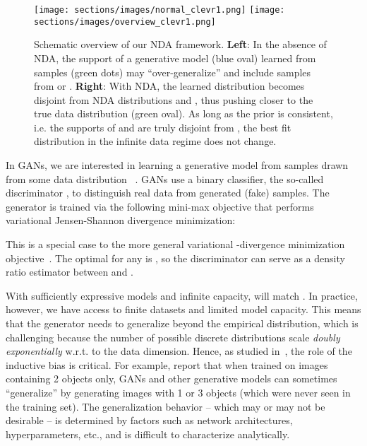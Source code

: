 \documentclass{article} \usepackage{iclr2021_conference,times}
\begin{document}
\begin{figure*}[!h]
\centering
    \texttt{[image: sections/images/normal\_clevr1.png]}\hspace{2em}
    \texttt{[image: sections/images/overview\_clevr1.png]}
    \caption{Schematic overview of our NDA framework. \textbf{Left}: In the absence of NDA, the support of a generative model  (blue oval) learned from samples (green dots) may ``over-generalize'' and include samples from  or . \textbf{Right}: With NDA, the learned distribution  becomes disjoint from NDA distributions  and , thus pushing   closer to the true data distribution  (green oval).
    As long as the prior is consistent, i.e. the supports of  and  are truly disjoint from , the best fit distribution in the infinite data regime does not change. 
}
    \label{fig:overview}
\end{figure*}

In GANs, we are interested in learning a generative model  from samples drawn from some data distribution ~\citep{goodfellow2014generative}.
GANs use a binary classifier, the so-called discriminator , to distinguish real data from generated (fake) samples. The generator  is trained 
via the following mini-max objective that performs variational Jensen-Shannon divergence minimization:

This is a special case to the more general variational -divergence minimization objective~\citep{nowozin2016f}. The optimal  for any  is , so the discriminator can serve as a density ratio estimator between  and . 



With sufficiently expressive models and infinite capacity,   will match . 
In practice, however, we have access to finite datasets and limited model capacity. 
This means that the generator needs to generalize beyond the empirical distribution, which is challenging because the number of possible discrete distributions scale \emph{doubly exponentially} w.r.t. to the data dimension.
Hence, as studied in~\citep{zhao2018bias}, the role of the inductive bias is critical.
For example, \cite{zhao2018bias} report that when trained on images containing 2 objects only, GANs and other generative models can sometimes 
``generalize''
by generating images with 1 or 3 objects (which were never seen in the training set).
The generalization behavior -- which may or may not be desirable -- is determined by factors such as network architectures, hyperparameters, etc., and is difficult to characterize analytically. 
\end{document}

